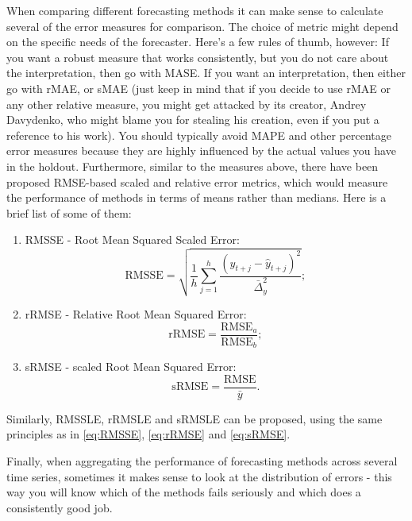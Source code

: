 \documentclass[
]{book}
\providecommand{\tightlist}{%
  \setlength{\itemsep}{0pt}\setlength{\parskip}{0pt}}
\theoremstyle{definition}
\theoremstyle{definition}
\theoremstyle{definition}
\theoremstyle{definition}
\theoremstyle{remark}
\begin{document}
When comparing different forecasting methods it can make sense to calculate several of the error measures for comparison. The choice of metric might depend on the specific needs of the forecaster. Here's a few rules of thumb, however: If you want a robust measure that works consistently, but you do not care about the interpretation, then go with MASE. If you want an interpretation, then either go with rMAE, or sMAE (just keep in mind that if you decide to use rMAE or any other relative measure, you might get attacked by its creator, Andrey Davydenko, who might blame you for stealing his creation, even if you put a reference to his work). You should typically avoid MAPE and other percentage error measures because they are highly influenced by the actual values you have in the holdout. Furthermore, similar to the measures above, there have been proposed RMSE-based scaled and relative error metrics, which would measure the performance of methods in terms of means rather than medians. Here is a brief list of some of them:

\begin{enumerate}
\def\labelenumi{\arabic{enumi}.}
\tightlist
\item
  RMSSE - Root Mean Squared Scaled Error:
  \begin{equation}
   \mathrm{RMSSE} = \sqrt{\frac{1}{h} \sum_{j=1}^h \frac{(y_{t+j} - \hat{y}_{t+j})^2}{\bar{\Delta}_y^2}} ;
   \label{eq:RMSSE}
  \end{equation}
\item
  rRMSE - Relative Root Mean Squared Error:
  \begin{equation}
   \mathrm{rRMSE} = \frac{\mathrm{RMSE}_a}{\mathrm{RMSE}_b} ;
   \label{eq:rRMSE}
  \end{equation}
\item
  sRMSE - scaled Root Mean Squared Error:
  \begin{equation}
   \mathrm{sRMSE} = \frac{\mathrm{RMSE}}{\bar{y}} .
   \label{eq:sRMSE}
  \end{equation}
\end{enumerate}

Similarly, RMSSLE, rRMSLE and sRMSLE can be proposed, using the same principles as in \eqref{eq:RMSSE}, \eqref{eq:rRMSE} and \eqref{eq:sRMSE}.

Finally, when aggregating the performance of forecasting methods across several time series, sometimes it makes sense to look at the distribution of errors - this way you will know which of the methods fails seriously and which does a consistently good job.
\end{document}
